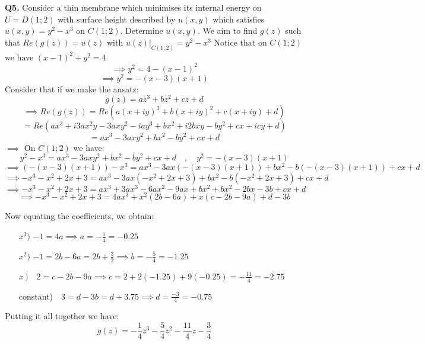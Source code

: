 \documentclass[12pt]{article}
\begin{document}
\[\]
\noindent \textbf{Q5.} Consider a thin membrane which minimises its internal energy on \(U = D(1;2)\) with surface height described by \(u\left(x,y\right)\) which satisfies \(u\left(x,y\right) = y^2 - x^3 \text{ on } C\left(1;2\right)\). Determine \(u\left(x,y\right)\).\newline
\linebreak
\noindent We aim to find \(g(z)\) such that \(Re(g(z)) = u(z)\) with \(u(z)|_{C(1;2)} = y^2 - x^3 \)\newline
\linebreak
\noindent Notice that on \(C(1;2)\) we have \(\left(x-1\right)^2+y^2=4\)
\[
\implies y^2 = 4 - \left(x-1\right)^2
\]
\[
    \implies y^2 = -\left(x-3\right)\left(x+1\right)
\]
Consider that if we make the ansatz:
\[
g(z) = az^3 + bz^2 + cz + d
\]
\[
\implies Re(g(z)) = Re(a\left(x+iy\right)^3 + b\left(x+iy\right)^2 + c\left(x+iy\right) + d)
\]
\[
= Re(a x^3 + i 3 a x^2 y - 3 a x y^2 - i a y^3 + b x^2 + i 2 b x y - b y^2 + c x + i c y + d)
\]
\[
=ax^3 - 3axy^2+bx^2-by^2+cx+d
\]
\(\implies\) {On } \(C(1;2)\) we have:
\[
y^2 - x^3 = ax^3 - 3axy^2+bx^2-by^2+cx+d \quad,\quad y^2 = -\left(x-3\right)\left(x+1\right)
\]
\[
\implies \left(-\left(x-3\right)\left(x+1\right)\right) - x^3 = ax^3 - 3ax\left(-\left(x-3\right)\left(x+1\right)\right)+bx^2-b\left(-\left(x-3\right)\left(x+1\right)\right)+cx+d
\]
\[
\implies -x^3 - x^2 + 2x + 3 = ax^3 -3ax\left(-x^2+2x+3\right)+bx^2-b\left(-x^2+2x+3\right)+cx + d
\]
\[
\implies -x^3 - x^2 + 2x + 3 = ax^3 +3ax^3-6ax^2-9ax+bx^2+bx^2-2bx-3b +cx + d
\]
\[
    \implies -x^3 - x^2 + 2x + 3 = 4ax^3 + x^2\left(2b-6a\right)+x\left(c-2b-9a\right)+d-3b
\]


\noindent Now equating the coefficients, we obtain:
\begin{enumerate}
    \item[\(x^3)\)] \qquad \(-1 = 4a \implies a = -\frac{1}{4} = -0.25\)
    \item[\(x^2)\)] \qquad \(-1 = 2b - 6a = 2b + \frac{3}{2} \implies b = -\frac{5}{4}= -1.25\)
    \item[\(x\,)\)] \qquad \(\,\,\,\, 2 = c-2b-9a \implies c = 2 + 2\left(-1.25\right)+9\left(-0.25\right) = -\frac{11}{4}=-2.75 \)
    \item[constant)] \qquad \(\,\,\,\, 3 = d-3b = d+3.75 \implies d = \frac{-3}{4} = -0.75\)
\end{enumerate}



\noindent Putting it all together we have:
\[
g(z) = -\frac{1}{4}z^3  -\frac{5}{4}z^2  -\frac{11}{4}z - \frac{3}{4}
\]
\end{document}
